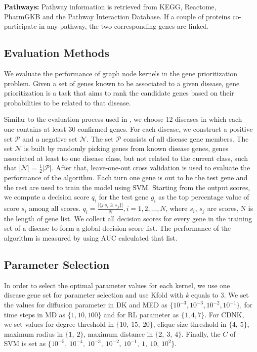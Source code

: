 \documentclass{esannV2}
\begin{document}
\textbf{Pathways:} Pathway information is retrieved from KEGG, Reactome, PharmGKB and the Pathway Interaction Database. If a couple of proteins co-participate in any pathway, the two corresponding genes are linked.  

\subsection{Evaluation Methods}
We evaluate the performance of graph node kernels in the gene prioritization problem. Given a set of genes known to be associated to a given disease, gene prioritization is a task that aims to rank the candidate genes based on their probabilities to be related to that disease.

Similar to the evaluation process used in \cite{medk}, we choose 12 diseases in which each one contains at least 30 confirmed genes. For each disease, we construct a positive set $\mathcal{P}$ and a negative set $\mathcal{N}$. The set $\mathcal{P}$ consists of all disease gene members. The set $\mathcal{N}$ is built by randomly picking genes from known disease genes, genes associated at least to one disease class, but not related to the current class, such that $\vert \mathcal{N} \vert = \frac{1}{2} \vert \mathcal{P} \vert$. After that, leave-one-out cross validation is used to evaluate the performance of the algorithm. Each turn one gene is out to be the test gene and the rest are used to train the model using SVM. Starting from the output scores, we compute a decision score $q_i$ for the test gene $g_i$ as the top percentage value of score $s_i$ among all scores. $q_{i} = \frac{\vert \{j\vert s_{i} \geq s_{j}  \rbrace \vert}{N}, i = 1,2,\ldots,N$, where $s_i$, $s_j$ are scores, N is the length of gene list. We collect all decision scores for every gene in the training set of a disease to form a global decision score list. The performance of the algorithm is measured by using AUC calculated that list. 

\subsection{Parameter Selection}
In order to select the optimal parameter values for each kernel, we use one disease gene set for parameter selection and use Kfold with \textit{k} equals to 3. We set the values for diffusion parameter in DK and MED as $\lbrace 10^{-3}, 10^{-3}, 10^{-2}, 10^{-1} \rbrace$, for time steps in MD as $\lbrace 1, 10, 100 \rbrace$ and for RL parameter as $\lbrace 1, 4, 7 \rbrace$. For CDNK, we set values for degree threshold in $\lbrace 10,\ 15,\ 20 \rbrace$, clique size threshold in $\lbrace 4,\ 5 \rbrace$, maximum radius in $\lbrace 1,\ 2 \rbrace$, maximum distance in $\lbrace 2,\ 3,\ 4 \rbrace$. Finally, the $C$ of SVM is set as $\lbrace 10^{-5},  \ 10^{-4}, \ 10^{-3},\ 10^{-2},\ 10^{-1},\ 1,\ 10,\ 10^2 \rbrace$.
\end{document}
